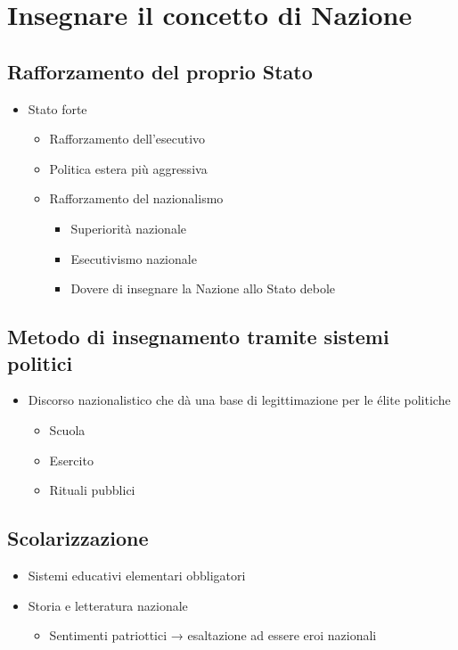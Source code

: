 \documentclass{article}
\begin{document}
\section{Insegnare il concetto di Nazione}

\subsection{Rafforzamento del proprio Stato}
\begin{itemize}
    \item Stato forte
    \begin{itemize}
        \item Rafforzamento dell’esecutivo
        \item Politica estera più aggressiva
        \item Rafforzamento del nazionalismo
        \begin{itemize}
            \item Superiorità nazionale
            \item Esecutivismo nazionale
            \item Dovere di insegnare la Nazione allo Stato debole
        \end{itemize}
    \end{itemize}
\end{itemize}

\subsection{Metodo di insegnamento tramite sistemi politici}
\begin{itemize}
    \item Discorso nazionalistico che dà una base di legittimazione per le élite politiche
    \begin{itemize}
        \item Scuola
        \item Esercito
        \item Rituali pubblici
    \end{itemize}
\end{itemize}

\subsection{Scolarizzazione}
\begin{itemize}
    \item Sistemi educativi elementari obbligatori
    \item Storia e letteratura nazionale
    \begin{itemize}
        \item Sentimenti patriottici → esaltazione ad essere eroi nazionali
    \end{itemize}
\end{itemize}
\end{document}
